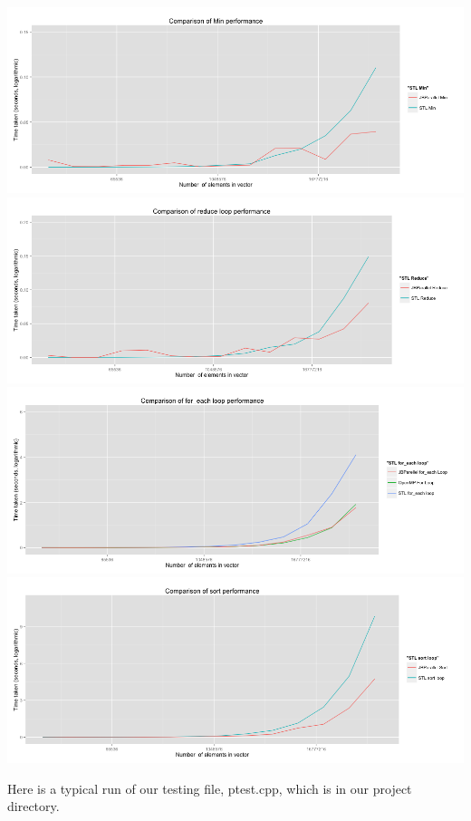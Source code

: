 \documentclass{article}
\begin{document}
\includegraphics[scale = 0.4]{Min_comparison}
\\\includegraphics[scale = 0.4]{Reduce_comparison}
\\\includegraphics[scale = 0.4]{for_each_loop_comparison}
\\\includegraphics[scale = 0.4]{sort_comparison}

Here is a typical run of our testing file, ptest.cpp, which is in our project directory.
\end{document}
